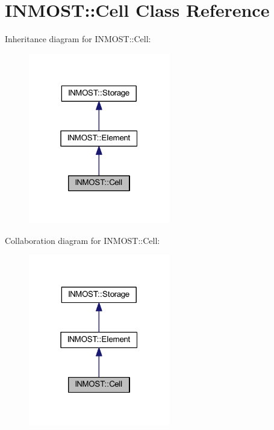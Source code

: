 \hypertarget{classINMOST_1_1Cell}{\section{I\-N\-M\-O\-S\-T\-:\-:Cell Class Reference}
\label{classINMOST_1_1Cell}
}


Inheritance diagram for I\-N\-M\-O\-S\-T\-:\-:Cell\-:
\nopagebreak
\begin{figure}[H]
\begin{center}
\leavevmode
\includegraphics[width=175pt]{classINMOST_1_1Cell__inherit__graph}
\end{center}
\end{figure}


Collaboration diagram for I\-N\-M\-O\-S\-T\-:\-:Cell\-:
\nopagebreak
\begin{figure}[H]
\begin{center}
\leavevmode
\includegraphics[width=175pt]{classINMOST_1_1Cell__coll__graph}
\end{center}
\end{figure}
